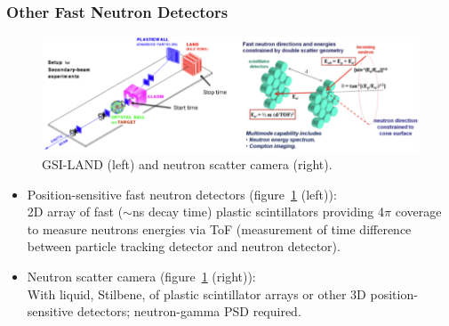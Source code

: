 \subsubsection{Other Fast Neutron Detectors}
\begin{figure}[ht]
    \centering
    \includegraphics[width=1.0\textwidth]{images/position_fast_neutron.png}
    \caption{GSI-LAND (left) and neutron scatter camera (right).}
    \label{fig:position_fast_neutron}
\end{figure}
\begin{itemize}
    \item Position-sensitive fast neutron detectors (figure~\ref{fig:position_fast_neutron} (left)):\\
    2D array of fast ($\sim$ns decay time) plastic scintillators providing 4$\pi$ coverage to measure neutrons energies via ToF (measurement of time difference between particle tracking detector and neutron detector).
    \item Neutron scatter camera (figure~\ref{fig:position_fast_neutron} (right)):\\
    With liquid, Stilbene, of plastic scintillator arrays or other 3D position-sensitive detectors; neutron-gamma PSD required.
\end{itemize}
